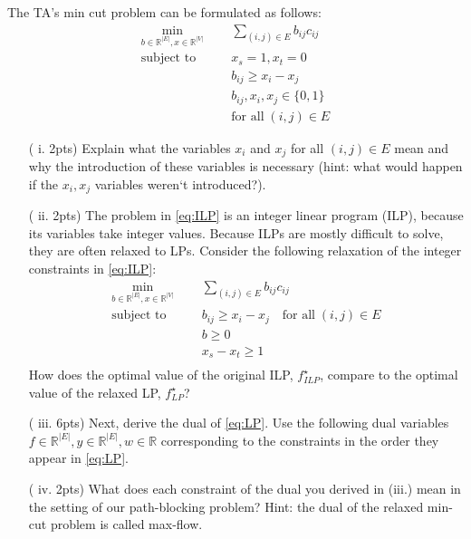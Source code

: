 \documentclass{article}
\theoremstyle{remark}
\theoremstyle{definition}
\newcommand{\subjectto}{\mbox{subject to}}
\begin{document}
\begin{enumerate}
		\quad \quad The TA's min cut problem can be formulated as follows:
		    \begin{equation} \label{eq:ILP}
	        \begin{aligned}
			\min_{b\in \mathbb{R}^{|E|}, x\in \mathbb{R}^{|V|}} \quad & \sum_{(i,j)\in E}b_{ij}c_{ij} \\
			\subjectto \quad  \quad   & x_s = 1, x_t = 0 \\
					     &  b_{ij}  \geq x_i - x_j \\
	    				     & b_{ij}, x_i, x_j \in \{0,1\} \\
	    				     & \text{for all} \; (i,j) \in E
			\end{aligned}
			\end{equation}
	    \begin{enumerate}
	    \item[( i. 2pts)] Explain what the variables $x_i$ and $x_j$ for all $(i,j) \in E$ mean and why the introduction of these variables is necessary (hint: what would happen if the $x_i,x_j$ variables weren`t introduced?).
		\item[( ii. 2pts)]  The problem in \eqref{eq:ILP} is an integer linear program (ILP), because its variables take integer values. Because ILPs are mostly difficult to solve, they are often relaxed to LPs. Consider the following relaxation of the integer constraints in \eqref{eq:ILP}:
		    \begin{equation}
	        \begin{aligned}
			\min_{b\in \mathbb{R}^{|E|}, x\in \mathbb{R}^{|V|}} \quad & \sum_{(i,j)\in E}b_{ij}c_{ij} \\
			\subjectto \quad    \quad  &  b_{ij}  \geq x_i - x_j \quad \text{for all} \; (i,j) \in E \\
	    				                & b \geq 0 \\
	    				                & x_s - x_t \geq 1 \\
			\end{aligned}
			\label{eq:LP}
			\end{equation}
		How does the optimal value of the original ILP, $f^{\star}_{ILP}$, compare to the optimal value of the relaxed LP, $f^{\star}_{LP}$?
		\item[( iii. 6pts)]  Next, derive the dual of \eqref{eq:LP}. Use the following dual variables $f \in \mathbb{R}^{|E|}, y \in \mathbb{R}^{|E|}, w \in \mathbb{R}$ corresponding to the constraints in the order they appear in \eqref{eq:LP}.
		\item[( iv. 2pts)]  What does each constraint of the dual you derived in (iii.) mean in the setting of our path-blocking problem? Hint: the dual of the relaxed min-cut problem is called max-flow.

\end{enumerate}
\end{enumerate}
\end{document}
